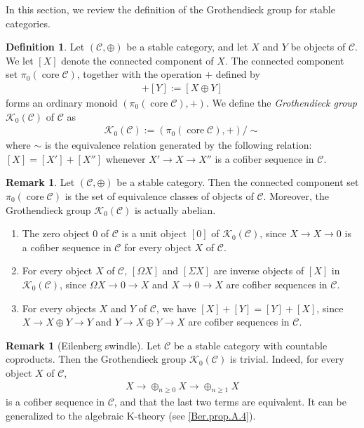 \documentclass[a4paper,dvipdfmx,11pt,reqno]{amsart}
\newcommand{\C}{\mathcal{C}}
\newcommand{\K}{\mathcal{K}}
\DeclareMathOperator{\core}{core}
\theoremstyle{definition}
\newtheorem{definition}[theorem]{Definition}
\newtheorem{remark}[theorem]{Remark}
\begin{document}
In this section, we review the definition of the Grothendieck group for stable categories.

\begin{definition} \label{Ber.def.2.1}
  Let $(\C,\oplus)$ be a stable category, and let $X$ and $Y$ be objects of $\C$.
  We let $[X]$ denote the connected component of $X$.
  The connected component set $\pi_0(\core\C)$, together with the operation $+$ defined by 
  \begin{align*}
    [X] + [Y] := [X \oplus Y]
  \end{align*}
  forms an ordinary monoid $(\pi_0(\core\C),+)$.
  We define the \textit{Grothendieck group} $\K_0(\C)$ of $\C$ as 
  \begin{align*}
    \K_0(\C) := (\pi_0(\core\C),+) / \sim
  \end{align*}
  where $\sim$ is the equivalence relation generated by the following relation:
  $[X]=[X']+[X'']$ whenever $X' \to X \to X''$ is a cofiber sequence in $\C$.
\end{definition}

\begin{remark} \label{Ber.rem.2.2}
  Let $(\C,\oplus)$ be a stable category.
  Then the connected component set $\pi_0(\core\C)$ is the set of equivalence classes of objects of $\C$.
  Moreover, the Grothendieck group $\K_0(\C)$ is actually abelian.
  \begin{enumerate}
    \item The zero object $0$ of $\C$ is a unit object $[0]$ of $\K_0(\C)$, since $X \to X \to 0$ is a cofiber sequence in $\C$ for every object $X$ of $\C$.
    \item For every object $X$ of $\C$, $[\Omega X]$ and $[\Sigma X]$ are inverse objects of $[X]$ in $\K_0(\C)$, since $\Omega X \to 0 \to X$ and $X \to 0 \to X$ are cofiber sequences in $\C$.
    \item For every objects $X$ and $Y$ of $\C$, we have $[X]+[Y]=[Y]+[X]$, since $X \to X \oplus Y \to Y$ and $Y \to X \oplus Y \to X$ are cofiber sequences in $\C$.
  \end{enumerate}
\end{remark}

\begin{remark}[Eilenberg swindle]
  Let $\C$ be a stable category with countable coproducts.
  Then the Grothendieck group $\K_0(\C)$ is trivial.
  Indeed, for every object $X$ of $\C$, 
  \begin{align*}
    X \to \oplus_{n \geq 0} X \to \oplus_{n \geq 1} X
  \end{align*}
  is a cofiber sequence in $\C$, and that the last two terms are equivalent.
  It can be generalized to the algebraic K-theory (see \cref{Ber.prop.A.4}).
\end{remark}
\end{document}
